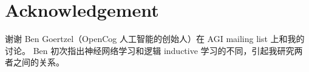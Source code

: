 \documentclass[orivec]{llncs}
\begin{document}
\section*{Acknowledgement}

\footnotesize{谢谢 Ben Goertzel（OpenCog 人工智能的创始人）在 AGI mailing list 上和我的讨论。 Ben 初次指出神经网络学习和逻辑 inductive 学习的不同，引起我研究两者之间的关系。}

\end{document}
